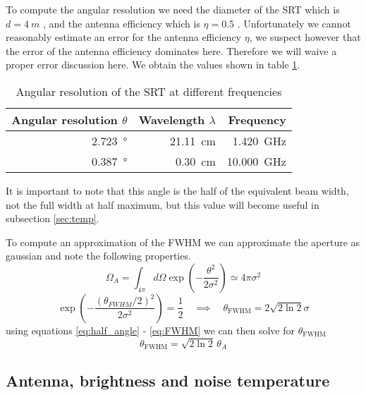 To compute the angular resolution we need the diameter of the SRT which is $d = \SI{4}{m}$ \cite[p. 4]{srt}, and the antenna efficiency which is $\eta = 0.5$ \cite[p. 2]{srt}.
Unfortunately we cannot reasonably estimate an error for the antenna efficiency $\eta$, we suspect however that the error of the antenna efficiency dominates here. 
Therefore we will waive a proper error discussion here.
We obtain the values shown in table \ref{tab:ang_res}.
\begin{table}[h]
    \centering
    \begin{tabular}{rrr}
        \toprule
        Angular resolution $\theta$ & Wavelength $\lambda$ & Frequency\\
        \midrule
        \SI{2.723}{\degree} & \SI{21.11}{cm} & \SI{1.420}{\giga \hertz}\\
        \SI{0.387}{\degree} & \SI{0.30}{cm} & \SI{10.000}{\giga \hertz}\\
        \bottomrule
    \end{tabular}
    \caption{Angular resolution of the SRT at different frequencies}
    \label{tab:ang_res}
\end{table}

It is important to note that this angle is the half of the equivalent beam width, not the full width at half maximum, but this value will become useful in subsection \ref{sec:temp}.

To compute an approximation of the FWHM we can approximate the aperture as gaussian \cite[p. 2]{script} and note the following properties.
\begin{equation}
    \Omega_A = \int_{4\pi} d\Omega \exp{\left( -\frac{\theta^2}{2\sigma^2} \right)} \simeq 4\pi \sigma^2
\end{equation}
\begin{equation}
    \exp{\left( -\frac{(\theta_{FWHM}/2)^2}{2\sigma^2}\right)} = \frac{1}{2} \quad \implies \quad \theta_{\text{FWHM}} = 2 \sqrt{2\ln{2}} \sigma \label{eq:FWHM}
\end{equation}
using equations \eqref{eq:half_angle} - \eqref{eq:FWHM} we can then solve for $\theta_{\text{FWHM}}$
\begin{equation}
    \theta_{\text{FWHM}} = \sqrt{2\ln{2}} \, \theta_A
\end{equation}

\subsection{Antenna, brightness and noise temperature}

